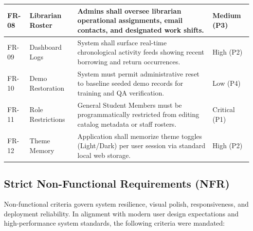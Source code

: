\documentclass[10pt,journal,compsoc]{IEEEtran}
\begin{document}
\begin{center}
\begin{longtable}{|L{1.8cm}|L{2.8cm}|L{7.5cm}|L{3.0cm}|}
\hline
{}
FR-08 & Librarian Roster & Admins shall oversee librarian operational assignments, email contacts, and designated work shifts. & Medium (P3) \\
\hline
FR-09 & Dashboard Logs & System shall surface real-time chronological activity feeds showing recent borrowing and return occurrences. & High (P2) \\
\hline
{}
FR-10 & Demo Restoration & System must permit administrative reset to baseline seeded demo records for training and QA verification. & Low (P4) \\
\hline
FR-11 & Role Restrictions & General Student Members must be programmatically restricted from editing catalog metadata or staff rosters. & Critical (P1) \\
\hline
{}
FR-12 & Theme Memory & Application shall memorize theme toggles (Light/Dark) per user session via standard local web storage. & High (P2) \\
\hline
\end{longtable}
\end{center}

\subsection{Strict Non-Functional Requirements (NFR)}
Non-functional criteria govern system resilience, visual polish, responsiveness, and deployment reliability. In alignment with modern user design expectations and high-performance system standards, the following criteria were mandated:
\end{document}
